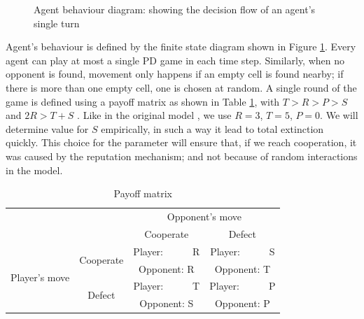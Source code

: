 \documentclass[english]{article}
\begin{document}
\begin{figure}[h]
  \centering
  \caption{Agent behaviour diagram: showing the decision flow of an agent's single turn}
  \label{fig:agent_behaviour}
\end{figure}

Agent's behaviour is defined by the finite state diagram shown in Figure \ref{fig:agent_behaviour}.
Every agent can play at most a single PD game in each time step.
Similarly, when no opponent is found, movement only happens if an empty cell is found nearby; if there is more than one empty cell, one is chosen at random.
A single round of the game is defined using a payoff matrix as shown in Table \ref{table:payoff}, with $T > R > P > S$ and $2R > T + S$ \citep{chammah1965}.
Like in the original model \citep{smaldino},
we use $R = 3$, $T = 5$, $P = 0$.
We will determine value for $S$ empirically, in such a way it lead to total extinction quickly. This choice for the parameter will ensure that, if we reach cooperation, it was caused by the reputation mechanism;
and not because of random interactions in the model.

\begin{table}[h!]
  \centering
  \begin{tabular}{c c||c|c}
    & & \multicolumn{2}{c}{Opponent's move} \\
    & & Cooperate & Defect \\
    \hline\hline

    \multirow{4}{6em}{Player's move}
    & \multirow{2}{5em}{Cooperate}
      & Player:\ \ \ \ \ \ R & Player:\ \ \ \ \ \ S \\
    & & Opponent: R & Opponent: T \\
    \cline{2-4}
    & \multirow{2}{5em}{Defect}
      & Player:\ \ \ \ \ \ T & Player:\ \ \ \ \ \ P \\
    & & Opponent: S & Opponent: P \\
  \end{tabular}

  \caption{Payoff matrix}
  \label{table:payoff}
\end{table}
\end{document}
